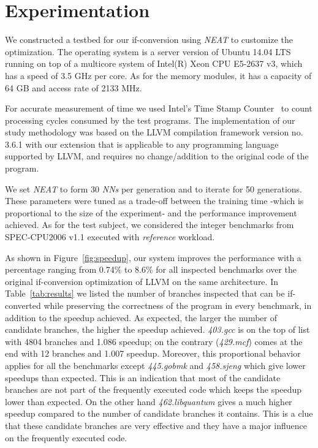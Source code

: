 \documentclass[preprint,nocopyrightspace]{sigplanconf}
\begin{document}
\section{Experimentation}
\label{expr}

We constructed a testbed for our if-conversion using \textit{NEAT} to customize the optimization. The operating system is a server version of Ubuntu 14.04 LTS running on top of a multicore system of Intel(R) Xeon CPU E5-2637 v3, which has a speed of 3.5 GHz per core. As for the memory modules, it has a capacity of 64 GB and access rate of 2133 MHz. 

For accurate measurement of time we used Intel's Time Stamp Counter~\cite{rdtsc}
to count processing cycles consumed by the test programs. The implementation of our study methodology was based on the LLVM compilation framework version no. 3.6.1 with our extension that is applicable to any programming language supported by LLVM, and requires no change/addition to the original code of the program. 

We set \textit{NEAT} to form 30 \textit{NNs} per generation and to iterate for 50 generations. These parameters were tuned as a trade-off between the training time -which is proportional to the size of the experiment- and the performance improvement achieved.
As for the test subject, we considered the integer benchmarks from  SPEC-CPU2006 v1.1 \cite{spec} executed with \textit{reference} workload.

As shown in Figure~\ref{fig:speedup}, our system improves the performance with a percentage ranging from 0.74\% to 8.6\% for all inspected benchmarks over the original if-conversion optimization of LLVM on the same architecture. In Table~\ref{tab:results} we listed the number of branches inspected that can be if-converted while preserving the correctness of the program in every benchmark, in addition to the speedup achieved. As expected, the larger the number of candidate branches, the higher the speedup achieved. \textit{403.gcc} is on the top of list with 4804 branches and 1.086 speedup; on the contrary (\textit{429.mcf}) comes at the end with 12 branches and 1.007 speedup. Moreover, this proportional behavior applies for all the benchmarks except \textit{445.gobmk} and \textit{458.sjeng} which give lower speedups than expected. This is an indication that most of the candidate branches are not part of the frequently executed code which keeps the speedup lower than expected. On the other hand \textit{462.libquantum} gives a much higher speedup compared to the number of candidate branches it contains. This is a clue that these candidate branches are very effective and they have a major influence on the frequently executed code.
\end{document}
